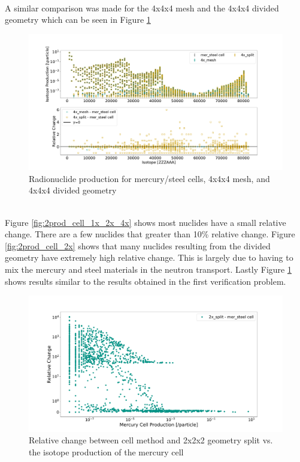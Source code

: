 %
\\
A similar comparison was made for the 4x4x4 mesh and the 4x4x4 divided geometry
which can be seen in Figure \ref{fig:2prod_cell_4x}
%
\begin{figure}[h!]
 \centering
 \includegraphics[scale=0.42,trim={2cm 1cm 3cm 2cm},clip]{../figs/toy_p2/prod_VPII_4x.pdf}
 \caption{Radionuclide production for mercury/steel cells, 4x4x4 mesh, and 4x4x4 divided geometry}
 \label{fig:2prod_cell_4x}
\end{figure}
%
\\
Figure \ref{fig:2prod_cell_1x_2x_4x} shows most nuclides have a small relative
change. There are a few nuclides that greater than 10\% relative change.
Figure \ref{fig:2prod_cell_2x} shows that many nuclides resulting from the
divided geometry have extremely high relative change. This is largely due to
having to mix the mercury and steel materials in the neutron transport. Lastly
Figure \ref{fig:2prod_cell_4x} shows results similar to the results obtained in
the first verification problem.
%
\begin{figure}[h!]
 \centering
 \includegraphics[scale=0.4,trim={3cm 0.5cm 3cm 3cm},clip]{../figs/toy_p2/prod_VPII_rc_2x_split.pdf}
 \caption{Relative change between cell method and 2x2x2 geometry split vs. the isotope production of the mercury cell}
 \label{fig:2prod_cell_2x_rc}
\end{figure}
